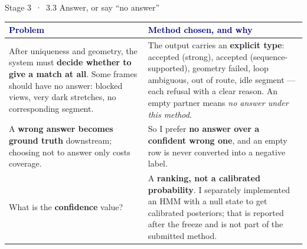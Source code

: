 \documentclass[10pt,aspectratio=169]{beamer}
\begin{document}
\begin{frame}{Stage 3 \,·\, 3.3 Answer, or say ``no answer''}
\begin{tabularx}{\textwidth}{@{}>{\raggedright\arraybackslash}p{}>{\raggedright\arraybackslash}X@{}}
\toprule \textcolor{navy}{\textbf{Problem}} & \textcolor{navy}{\textbf{Method chosen, and why}} \\ \midrule
After uniqueness and geometry, the system must \textbf{decide whether to give a match at all}. Some frames should have no answer: blocked views, very dark stretches, no corresponding segment. & The output carries an \textbf{explicit type}: accepted (strong), accepted (sequence-supported), geometry failed, loop ambiguous, out of route, idle segment --- each refusal with a clear reason. An empty partner means \emph{no answer under this method}. \\
\addlinespace[3pt]
A \textbf{wrong answer becomes ground truth} downstream; choosing not to answer only costs coverage. & So I prefer \textbf{no answer over a confident wrong one}, and an empty row is never converted into a negative label. \\
\addlinespace[3pt]
What is the \textbf{confidence} value? & A \textbf{ranking, not a calibrated probability}. I separately implemented an HMM with a null state to get calibrated posteriors; that is reported after the freeze and is not part of the submitted method. \\
\bottomrule\end{tabularx}
\end{frame}
\end{document}
